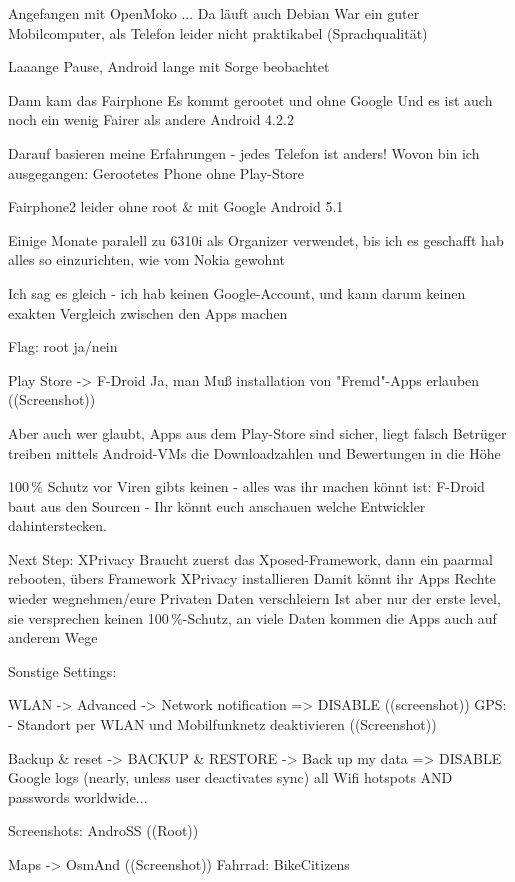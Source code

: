 \documentclass{beamer}
\begin{document}
Angefangen mit OpenMoko ... Da läuft auch Debian
  War ein guter Mobilcomputer, als Telefon leider nicht praktikabel (Sprachqualität)

Laaange Pause, Android lange mit Sorge beobachtet

Dann kam das Fairphone
  Es kommt gerootet und ohne Google
  Und es ist auch noch ein wenig Fairer als andere
  Android 4.2.2

    Darauf basieren meine Erfahrungen - jedes Telefon ist anders!
  Wovon bin ich ausgegangen: Gerootetes Phone ohne Play-Store

Fairphone2 
  leider ohne root \& mit Google
  Android 5.1

Einige Monate paralell zu 6310i als Organizer verwendet, bis ich es geschafft hab alles so einzurichten, wie vom Nokia gewohnt


Ich sag es gleich - ich hab keinen Google-Account, und kann darum keinen exakten Vergleich zwischen den Apps machen

Flag: root ja/nein 


Play Store -> F-Droid
  Ja, man Muß installation von "Fremd"-Apps erlauben ((Screenshot))

  Aber auch wer glaubt, Apps aus dem Play-Store sind sicher, liegt falsch
  Betrüger treiben mittels Android-VMs die Downloadzahlen und Bewertungen in die Höhe

  100\,\% Schutz vor Viren gibts keinen - alles was ihr machen könnt ist: 
    F-Droid baut aus den Sourcen - Ihr könnt euch anschauen welche Entwickler dahinterstecken.
    

Next Step: XPrivacy
  Braucht zuerst das Xposed-Framework, dann ein paarmal rebooten, übers Framework XPrivacy installieren
  Damit könnt ihr Apps Rechte wieder wegnehmen/eure Privaten Daten verschleiern
  Ist aber nur der erste level, sie versprechen keinen 100\,\%-Schutz, an viele Daten kommen die Apps auch auf anderem Wege

Sonstige Settings:

  WLAN -> Advanced -> Network notification => DISABLE ((screenshot))
  GPS: - Standort per WLAN und Mobilfunknetz deaktivieren ((Screenshot))

  Backup & reset -> BACKUP & RESTORE -> Back up my data => DISABLE
  Google logs (nearly, unless user deactivates sync) all Wifi hotspots AND passwords worldwide...

  Screenshots: AndroSS ((Root))

  Maps -> OsmAnd ((Screenshot))
    Fahrrad: BikeCitizens
\end{document}
